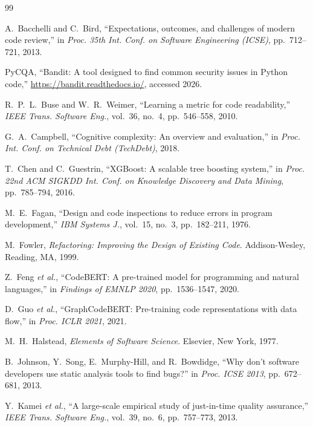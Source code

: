 \documentclass[12pt, oneside]{report}
\begin{document}

\begin{thebibliography}{99}

A.~Bacchelli and C.~Bird,
``Expectations, outcomes, and challenges of modern code review,''
in \textit{Proc. 35th Int. Conf. on Software Engineering (ICSE)},
pp.~712--721, 2013.

PyCQA,
``Bandit: A tool designed to find common security issues in Python code,''
\url{https://bandit.readthedocs.io/}, accessed 2026.

R.~P.~L.~Buse and W.~R.~Weimer,
``Learning a metric for code readability,''
\textit{IEEE Trans. Software Eng.}, vol.~36, no.~4, pp.~546--558, 2010.

G.~A.~Campbell,
``Cognitive complexity: An overview and evaluation,''
in \textit{Proc. Int. Conf. on Technical Debt (TechDebt)}, 2018.

T.~Chen and C.~Guestrin,
``XGBoost: A scalable tree boosting system,''
in \textit{Proc. 22nd ACM SIGKDD Int. Conf. on Knowledge Discovery and Data Mining},
pp.~785--794, 2016.

M.~E.~Fagan,
``Design and code inspections to reduce errors in program development,''
\textit{IBM Systems J.}, vol.~15, no.~3, pp.~182--211, 1976.

M.~Fowler,
\textit{Refactoring: Improving the Design of Existing Code}.
Addison-Wesley, Reading, MA, 1999.

Z.~Feng \textit{et al.},
``CodeBERT: A pre-trained model for programming and natural languages,''
in \textit{Findings of EMNLP 2020}, pp.~1536--1547, 2020.

D.~Guo \textit{et al.},
``GraphCodeBERT: Pre-training code representations with data flow,''
in \textit{Proc. ICLR 2021}, 2021.

M.~H.~Halstead,
\textit{Elements of Software Science}.
Elsevier, New York, 1977.

B.~Johnson, Y.~Song, E.~Murphy-Hill, and R.~Bowdidge,
``Why don't software developers use static analysis tools to find bugs?''
in \textit{Proc. ICSE 2013}, pp.~672--681, 2013.

Y.~Kamei \textit{et al.},
``A large-scale empirical study of just-in-time quality assurance,''
\textit{IEEE Trans. Software Eng.}, vol.~39, no.~6, pp.~757--773, 2013.


\end{thebibliography}
\end{document}
